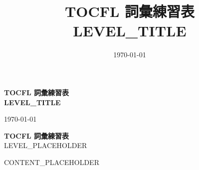 \documentclass[{PAPER_SIZE}paper,12pt]{ctexart}
\title{\Huge\bfseries TOCFL 詞彙練習表\\[1cm]
{\Large\bfseries {LEVEL_TITLE}}}
\date{\today}
\author{}
\begin{document}
\begin{titlingpage}
\begin{center}
\vspace*{2cm}
{\Huge\bfseries TOCFL 詞彙練習表}\\[1cm]
{\huge\bfseries {LEVEL_TITLE}}\\[2cm]

\vfill


\vfill

{\large \today}\\[1cm]
\end{center}
\end{titlingpage}

\begin{center}
{\LARGE\bfseries TOCFL 詞彙練習表} \\
\vspace{0.5cm}
{LEVEL_PLACEHOLDER}
\end{center}

{CONTENT_PLACEHOLDER}
\end{document}
